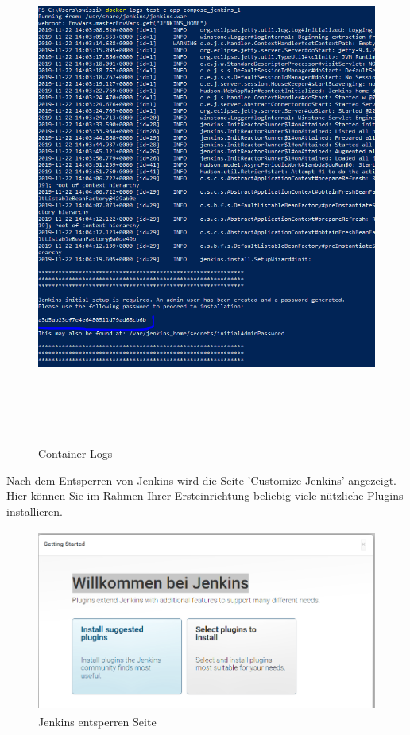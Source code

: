 \documentclass[a4paper,12pt,oneside]{book}
\begin{document}
\begin{figure}[h!]
	\begin{center}
		\includegraphics[width=15cm, height=17cm]{jenkins-logs.PNG}
		\caption{Container Logs} 
		\label{Container Logs} 
	\end{center}
\end{figure}
\newpage
Nach dem Entsperren von Jenkins wird die Seite 'Customize-Jenkins' angezeigt. Hier können Sie im Rahmen Ihrer Ersteinrichtung beliebig viele nützliche Plugins installieren.

\begin{figure}[h!]
	\begin{center}
		\includegraphics[width=17cm, height=6cm]{customize-jenkins.PNG}
		\caption{Jenkins entsperren Seite} 
		\label{Jenkins entsperren Seite} 
	\end{center}
\end{figure}
\end{document}
